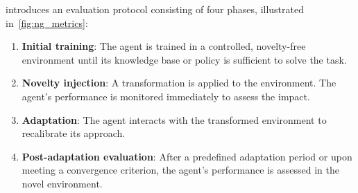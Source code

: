 \NovelGym{} introduces an evaluation protocol consisting of four phases, illustrated in~\cref{fig:ng_metrics}:
\begin{enumerate}[leftmargin=*]
    \item \textbf{Initial training}: The agent is trained in a controlled, novelty-free environment until its knowledge base or policy is sufficient to solve the task.
    \item \textbf{Novelty injection}: A transformation is applied to the environment. The agent's performance is monitored immediately to assess the impact.
    \item \textbf{Adaptation}: The agent interacts with the transformed environment to recalibrate its approach.
    \item \textbf{Post-adaptation evaluation}: After a predefined adaptation period or upon meeting a convergence criterion, the agent's performance is assessed in the novel environment.
\end{enumerate}

